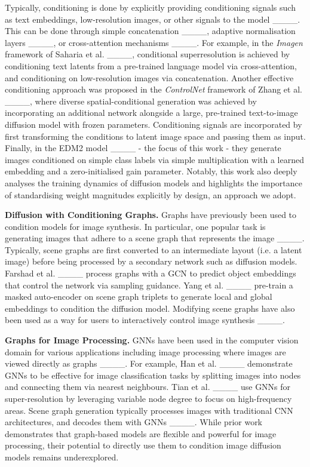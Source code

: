 Typically, conditioning is done by explicitly providing conditioning signals such as text embeddings, low-resolution images, or other signals to the model ____. This can be done through simple concatenation ____, adaptive normalisation layers ____, or cross-attention mechanisms ____. For example, in the \textit{Imagen} framework of Saharia et al. ____, conditional superresolution is achieved by conditioning text latents from a pre-trained language model via cross-attention, and conditioning on low-resolution images via concatenation. Another effective conditioning approach was proposed in the \textit{ControlNet} framework of Zhang et al. ____, where diverse spatial-conditional generation was achieved by incorporating an additional network alongside a large, pre-trained text-to-image diffusion model with frozen parameters. Conditioning signals are incorporated by first transforming the conditions to latent image space and passing them as input. Finally, in the EDM2 model ____ - the focus of this work - they generate images conditioned on simple class labels via simple multiplication with a learned embedding and a zero-initialised gain parameter. Notably, this work also deeply analyses the training dynamics of diffusion models and highlights the importance of standardising weight magnitudes explicitly by design, an approach we adopt.

\textbf{Diffusion with Conditioning Graphs.} Graphs have previously been used to condition models for image synthesis. In particular, one popular task is generating images that adhere to a scene graph that represents the image ____. Typically, scene graphs are first converted to an intermediate layout (i.e. a latent image) before being processed by a secondary network such as diffusion models. Farshad et al. ____ process graphs with a GCN to predict object embeddings that control the network via sampling guidance. Yang et al. ____ pre-train a masked auto-encoder on scene graph triplets to generate local and global embeddings to condition the diffusion model. Modifying scene graphs have also been used as a way for users to interactively control image synthesis ____. 

\textbf{Graphs for Image Processing.} GNNs have been used in the computer vision domain for various applications including image processing where images are viewed directly as graphs ____. For example, Han et al. ____ demonstrate GNNs to be effective for image classification tasks by splitting images into nodes and connecting them via nearest neighbours. Tian et al. ____ use GNNs for super-resolution by leveraging variable node degree to focus on high-frequency areas. Scene graph generation typically processes images with traditional CNN architectures, and decodes them with GNNs ____. While prior work demonstrates that graph-based models are flexible and powerful for image processing, their potential to directly use them to condition image diffusion models remains underexplored.


